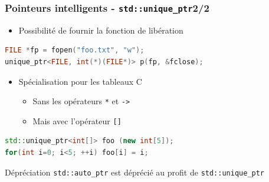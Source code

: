 \documentclass[C++.tex]{subfiles}
\begin{document}
\begin{frame}[fragile]
	\frametitle{Pointeurs intelligents - \lstinline|std::unique_ptr|\titlehfill{}2/2}
	\begin{itemize}
		\item Possibilité de fournir la fonction de libération
	\end{itemize}

	\begin{lstlisting}[language=C++]
FILE *fp = fopen("foo.txt", "w");
unique_ptr<FILE, int(*)(FILE*)> p(fp, &fclose);\end{lstlisting}


	\begin{itemize}
		\item Spécialisation pour les tableaux C
		\begin{itemize}
			\item Sans les opérateurs \lstinline|*| et \lstinline|->|
			\item Mais avec l'opérateur \lstinline|[]|
		\end{itemize}
	\end{itemize}

	\begin{lstlisting}[language=C++]
std::unique_ptr<int[]> foo (new int[5]);
for(int i=0; i<5; ++i) foo[i] = i;\end{lstlisting}

	\begin{block}{Dépréciation}
		\lstinline|std::auto_ptr| est déprécié au profit de \lstinline|std::unique_ptr|
	\end{block}
\end{frame}
\end{document}

